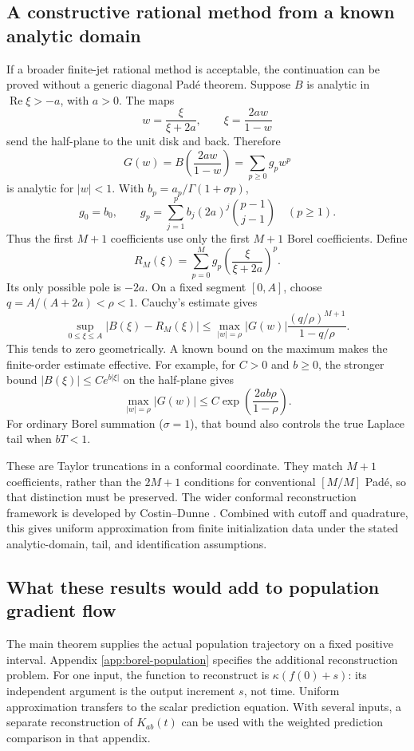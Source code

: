 \subsection{A constructive rational method from a known analytic domain}
\label{app:conformal-rational}

If a broader finite-jet rational method is acceptable, the continuation
can be proved without a generic diagonal Pad\'e theorem. Suppose $B$
is analytic in $\operatorname{Re}\xi>-a$, with $a>0$. The maps
\[
 w=\frac{\xi}{\xi+2a},\qquad \xi=\frac{2aw}{1-w}
\]
send the half-plane to the unit disk and back. Therefore
\[
 G(w)=B\!\left(\frac{2aw}{1-w}\right)=\sum_{p\ge0}g_pw^p
\]
is analytic for $|w|<1$. With $b_p=a_p/\Gamma(1+\sigma p)$,
\[
 g_0=b_0,\qquad
 g_p=\sum_{j=1}^{p}b_j(2a)^j\binom{p-1}{j-1}\quad(p\ge1).
\]
Thus the first $M+1$ coefficients use only the first $M+1$ Borel
coefficients. Define
\[
 R_M(\xi)=\sum_{p=0}^M g_p\left(\frac{\xi}{\xi+2a}\right)^p.
\]
Its only possible pole is $-2a$. On a fixed segment $[0,A]$, choose
$q=A/(A+2a)<\rho<1$. Cauchy's estimate gives
\[
 \sup_{0\le\xi\le A}|B(\xi)-R_M(\xi)|
 \le\max_{|w|=\rho}|G(w)|
 \frac{(q/\rho)^{M+1}}{1-q/\rho}.
\]
This tends to zero geometrically. A known bound on the maximum makes
the finite-order estimate effective. For example, for $C>0$ and $b\ge0$,
the stronger bound $|B(\xi)|\le C e^{b|\xi|}$ on the half-plane gives
\[
 \max_{|w|=\rho}|G(w)|
 \le C\exp\!\left(\frac{2ab\rho}{1-\rho}\right).
\]
For ordinary Borel summation ($\sigma=1$), that bound also controls
the true Laplace tail when $bT<1$.

These are Taylor truncations in a conformal coordinate. They match
$M+1$ coefficients, rather than the $2M+1$ conditions for conventional
$[M/M]$ Pad\'e, so that distinction must be preserved. The wider
conformal reconstruction framework is developed by Costin--Dunne
\cite[Theorem 8]{CostinDunne}. Combined with cutoff and quadrature,
this gives uniform approximation from finite initialization data under
the stated analytic-domain, tail, and identification assumptions.

\subsection{What these results would add to population gradient flow}

The main theorem supplies the actual population trajectory on a fixed
positive interval. Appendix \ref{app:borel-population} specifies the
additional reconstruction problem. For one input, the function to
reconstruct is $\kappa(f(0)+s)$: its independent argument is the
output increment $s$, not time. Uniform approximation transfers to
the scalar prediction equation. With several inputs, a separate
reconstruction of $K_{ab}(t)$ can be used with the weighted
prediction comparison in that appendix.

